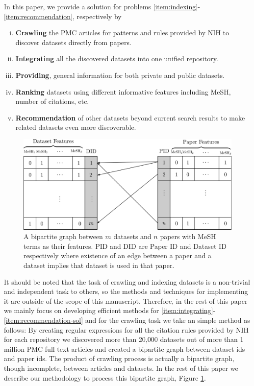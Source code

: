 \documentclass[twoside,11pt]{article}
\begin{document}
In this paper, we provide a solution for problems \eqref{item:indexing}-\eqref{item:recommendation}, respectively by
\begin{enumerate}[(i)]
	\item {\bf Crawling} the PMC articles for patterns and rules provided by NIH to discover datasets directly from papers. \label{item:crawiling}
	\item {\bf Integrating} all the discovered datasets into one unified repository. \label{item:integrating}
	\item {\bf Providing}, general information for both private and public datasets.
	\item {\bf Ranking} datasets using different informative features including MeSH, number of citations, etc.
	\item {\bf Recommendation} of other datasets beyond current search results to make related datasets even more discoverable. \label{item:recommendation-sol}
\end{enumerate}


\begin{figure}\label{fig:bipartite}
\centering
\includegraphics[scale=0.7]{bipartite.png}
\caption{A bipartite graph between $m$ datasets and $n$ papers with MeSH terms as their features. PID and DID are Paper ID and Dataset ID respectively where existence of an edge between a paper and a dataset implies that dataset is used in that paper.}
\end{figure}

It should be noted that the task of crawling and indexing datasets is a non-trivial and independent task to others, so the methods and techniques for implementing it are outside of the scope of this manuscript. Therefore, in the rest of this paper we mainly focus on developing efficient methods for \eqref{item:integrating}-\eqref{item:recommendation-sol} and for the crawling task we take an simple method as follows: 
By creating regular expressions for all the citation rules provided by NIH for each repository we discovered more than 20,000 datasets out of more than 1 million PMC full text articles and created a bipartite graph between dataset ids and paper ids. The  product of crawling process is actually a bipartite graph, though incomplete, between articles and datasets. In the rest of this paper we describe our methodology to process this bipartite graph, Figure \ref{fig:bipartite}.
\end{document}
